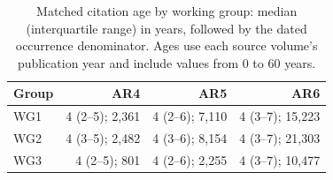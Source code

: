 \begin{table}[H]
\centering\small
\caption{Matched citation age by working group: median (interquartile range) in years, followed by the dated occurrence denominator. Ages use each source volume's publication year and include values from 0 to 60 years.}
\label{tab:wg_ages}
\begin{tabular}{@{}lrrr@{}}
\toprule
Group & AR4 & AR5 & AR6 \\
\midrule
WG1 & 4 (2--5); 2,361 & 4 (2--6); 7,110 & 4 (3--7); 15,223 \\
WG2 & 4 (3--5); 2,482 & 4 (3--6); 8,154 & 4 (3--7); 21,303 \\
WG3 & 4 (2--5); 801 & 4 (2--6); 2,255 & 4 (3--7); 10,477 \\
\bottomrule
\end{tabular}
\end{table}
